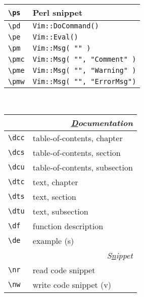 \documentclass[oneside,10pt,landscape,DIV16]{scrartcl}
\begin{document}
\begin{multicols}{3}
\begin{center}
\begin{tabular}[]{|p{11mm}|p{58mm}|}
\hline \verb'\ps'   & Perl snippet                       \\
\hline \verb'\pd'   & \texttt{Vim::DoCommand()}          \\
\hline \verb'\pe'   & \texttt{Vim::Eval()}               \\
\hline \verb'\pm'   & \texttt{Vim::Msg( "" )           } \\
\hline \verb'\pmc'  & \texttt{Vim::Msg( "", "Comment" )} \\
\hline \verb'\pme'  & \texttt{Vim::Msg( "", "Warning" )} \\
\hline \verb'\pmw'  & \texttt{Vim::Msg( "", "ErrorMsg")} \\
\hline
\end{tabular}\\
%
%
\begin{tabular}[]{|p{11mm}|p{58mm}|}
\hline
\multicolumn{2}{|r|}{\textsl{\underline{D}ocumentation}}                 \\[1.0ex]
\hline \verb'\dcc' & table-of-contents, chapter    \\
\hline \verb'\dcs' & table-of-contents, section    \\
\hline \verb'\dcu' & table-of-contents, subsection \\
\hline \verb'\dtc' & text, chapter                 \\
\hline \verb'\dts' & text, section                 \\
\hline \verb'\dtu' & text, subsection              \\
\hline \verb'\df'  & function description          \\
\hline \verb'\de'  & example                       \hfill (s)\\
\hline
\hline
\multicolumn{2}{|r|}{\textsl{S\underline{n}ippet}}                \\[1.0ex]
\hline \verb'\nr'  & read code snippet         \\
\hline \verb'\nw'  & write code snippet        \hfill (v)\\

\end{tabular}
\end{center}
\end{multicols}
\end{document}

